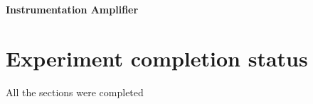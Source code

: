 \documentclass[12pt]{article}
\begin{document}
\textbf{\large Instrumentation Amplifier}
\begin{figure}[H]
  \begin{center}
\end{center}
\end{figure}

\begin{figure}[H]
    \begin{center}
  \end{center}
  \end{figure}

\section{Experiment completion status}
All the sections were completed
\end{document}
